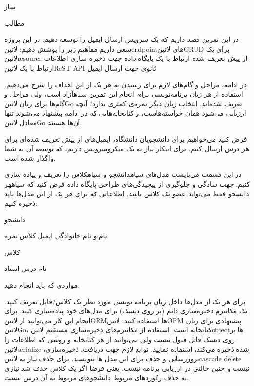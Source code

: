 \documentclass{../assignment}
\begin{document}
‌ساز

‌مطالب


در این تمرین قصد داریم که یک سرویس ارسال ایمیل را توسعه دهیم. در این پروژه سعی داریم مفاهیم زیر را پوشش دهیم:
 ‌لاتین{endpoint}های ‌لاتین{CRUD} برای یک ‌لاتین{resource} از پیش تعریف شده
 ارتباط با یک پایگاه داده جهت ذخیره سازی اطلاعات
 ارتباط با یک ‌لاتین{ReST API} ثانوی جهت ارسال ایمیل

در ادامه، مراحل و گام‌های لازم برای رسیدن به هر یک از این اهداف را شرح می‌دهیم.
استفاده از هر زبان برنامه‌نویسی برای انجام این تمرین ‌سیاه{آزاد} است، ولی مراحل و گام‌ها برای زبان ‌لاتین{Go} تعریف شده‌اند.
انتخاب زبان دیگر نمره‌ی کمتری ندارد؛ آنچه ارزیابی می‌شود همان خواسته‌هاست، و کتابخانه‌هایی که در ادامه پیشنهاد می‌شوند تنها معادل ‌لاتین{Go} آن‌ها هستند.


فرض کنید می‌خواهیم برای دانشجویان دانشگاه، ایمیل‌های از پیش تعریف شده‌ای برای هر درس ارسال کنیم.
برای اینکار نیاز به یک میکروسرویس داریم، که توسعه آن به شما واگذار شده است.


در این قسمت می‌بایست مدل‌های ‌سیاه{دانشجو} و ‌سیاه{کلاس} را تعریف و پیاده سازی کنیم.
جهت سادگی و جلوگیری از پیچیدگی‌های طراحی پایگاه داده فرض کنید که ‌سیاه{هر دانشجو فقط می‌تواند عضو یک کلاس باشد}.
اطلاعاتی که برای هر یک از این مدل‌ها باید ذخیره کنیم:


 داتشجو

 نام و نام خانوادگی
 ایمیل
 کلاس
 نمره

 کلاس

 نام درس
 استاد


مواردی که باید انجام دهید:


 برای هر یک از مدل‌ها داخل زبان برنامه نویسی مورد نظر یک کلاس/فایل تعریف کنید.
 یک مکانیزم ذخیره‌سازی دائم (بر روی دیسک) برای مدل‌های خود پیاده‌سازی کنید.
 برای انجام این کار می‌توانید از ‌لاتین{ORM}ها استفاده کنید. ‌لاتین{ORM} پیشنهادی برای زبان ‌لاتین{Go}، کتابخانه  است.
 استفاده از مکانیزم‌های ذخیره‌سازی مستقیم ‌لاتین{object}ها بر روی دیسک قابل قبول نیست ولی می‌توانید از هر کتابخانه و روشی که اطلاعات را ‌لاتین{serialize} شده ذخیره می‌کند، استفاده نمایید.
 توابع لازم جهت دریافت، ذخیره‌سازی، بروزرسانی و حذف برای این مدل ها بنویسید.
 برای حذف نیاز به ‌لاتین{cascade delete} نیست و چنین حالتی در ارزیابی برنامه نیست. یعنی فرضا اگر یک کلاس حذف شد نیازی به حذف رکوردهای مربوط دانشجوهای مربوط به آن درس نیست.
\end{document}
